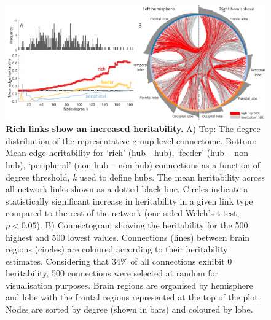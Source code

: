 \begin{figure}[h!]
\begin{center}
\includegraphics[width=1\textwidth]{Chapter5/Ch5Fig4.pdf}%
\end{center}
\caption{\textbf{Rich links show an increased heritability.} 
A) Top: The degree distribution of the representative group-level connectome. Bottom: Mean edge heritability for `rich' (hub - hub), `feeder' (hub – non-hub), `peripheral' (non-hub – non-hub) connections as a function of degree threshold, \textit{k} used to define hubs. The mean heritability across all network links shown as a dotted black line. Circles indicate a statistically significant increase in heritability in a given link type compared to the rest of the network (one-sided Welch’s t-test, $p < 0.05$). B) Connectogram showing the heritability for the 500 highest and 500 lowest values. Connections (lines) between brain regions (circles) are coloured according to their heritability estimates. Considering that $34\%$ of all connections exhibit 0 heritability, 500 connections were selected at random for visualisation purposes. Brain regions are organised by hemisphere and lobe with the frontal regions represented at the top of the plot. Nodes are sorted by degree (shown in bars) and coloured by lobe.}
\label{fig:Ch5Fig4}
\end{figure}

